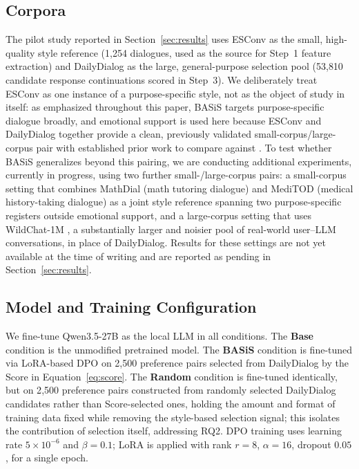 \documentclass[manuscript,review,anonymous]{acmart}
\begin{document}
\subsection{Corpora}
\label{sec:corpora}
The pilot study reported in Section~\ref{sec:results} uses ESConv \cite{liu2021esconv} as the small, high-quality style reference (1{,}254 dialogues, used as the source for Step~1 feature extraction) and DailyDialog \cite{li2017dailydialog} as the large, general-purpose selection pool (53{,}810 candidate response continuations scored in Step~3). We deliberately treat ESConv as one instance of a purpose-specific style, not as the object of study in itself: as emphasized throughout this paper, BASiS targets purpose-specific dialogue broadly, and emotional support is used here because ESConv and DailyDialog together provide a clean, previously validated small-corpus/large-corpus pair with established prior work to compare against \cite{wen2025guidedtod,wan2025emodynamix}. To test whether BASiS generalizes beyond this pairing, we are conducting additional experiments, currently in progress, using two further small-/large-corpus pairs: a small-corpus setting that combines MathDial \cite{macina2023mathdial} (math tutoring dialogue) and MediTOD \cite{saley2024meditod} (medical history-taking dialogue) as a joint style reference spanning two purpose-specific registers outside emotional support, and a large-corpus setting that uses WildChat-1M \cite{zhao2024wildchat}, a substantially larger and noisier pool of real-world user--LLM conversations, in place of DailyDialog. Results for these settings are not yet available at the time of writing and are reported as pending in Section~\ref{sec:results}.

\subsection{Model and Training Configuration}
We fine-tune Qwen3.5-27B as the local LLM in all conditions. The \textbf{Base} condition is the unmodified pretrained model. The \textbf{BASiS} condition is fine-tuned via LoRA-based DPO on 2{,}500 preference pairs selected from DailyDialog by the Score in Equation~\eqref{eq:score}. The \textbf{Random} condition is fine-tuned identically, but on 2{,}500 preference pairs constructed from randomly selected DailyDialog candidates rather than Score-selected ones, holding the amount and format of training data fixed while removing the style-based selection signal; this isolates the contribution of selection itself, addressing RQ2. DPO training uses learning rate $5\times10^{-6}$ and $\beta = 0.1$; LoRA is applied with rank $r=8$, $\alpha=16$, dropout $0.05$, for a single epoch.
\end{document}
